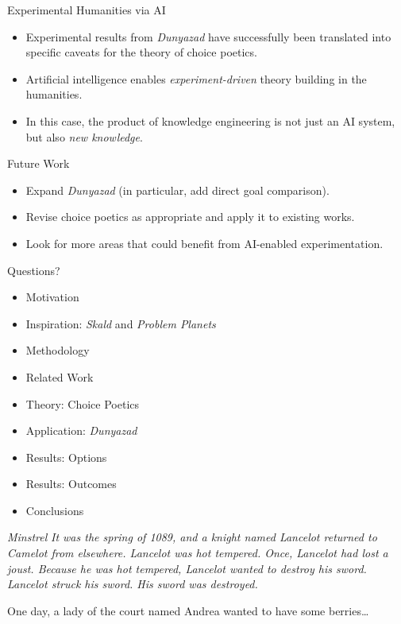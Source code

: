\documentclass[xcolor=x11names]{beamer}
\def\dunyazad/{\textit{Dunyazad}}
\def\minstrel/{\textit{Minstrel}}
\def\skald/{\textit{Skald}}
\def\problemplanets/{\textit{Problem Planets}}
\begin{document}
\begin{frame}{Experimental Humanities via AI}
  \begin{itemize}\addtolength{\itemsep}{0.5\baselineskip}
    \item Experimental results from \dunyazad/ have successfully been translated into specific caveats for the theory of choice poetics.
    \item Artificial intelligence enables \emph{experiment-driven} theory building in the humanities.
    \item In this case, the product of knowledge engineering is not just an AI system, but also \emph{new knowledge}.
  \end{itemize}
\end{frame}

\begin{frame}{Future Work}
  \begin{itemize}\addtolength{\itemsep}{0.5\baselineskip}
    \item Expand \dunyazad/ (in particular, add direct goal comparison).
    \item Revise choice poetics as appropriate and apply it to existing works.
    \item Look for more areas that could benefit from AI-enabled experimentation.
  \end{itemize}
\end{frame}

\begin{frame}{Questions?}
  \begin{itemize}
    \item Motivation
    \item Inspiration: \skald/ and \problemplanets/
    \item Methodology
    \item Related Work
    \item Theory: Choice Poetics
    \item Application: \dunyazad/
    \item Results: Options
    \item Results: Outcomes
    \item Conclusions
  \end{itemize}
\end{frame}


\begin{frame}{\minstrel/}
  \justifying
  \setlength{\parindent}{1.5em}
  \itshape
  It was the spring of 1089, and a knight named Lancelot returned to Camelot from elsewhere. Lancelot was hot tempered. Once, Lancelot had lost a joust. Because he was hot tempered, Lancelot wanted to destroy his sword. Lancelot struck his sword. His sword was destroyed.

  One day, a lady of the court named Andrea wanted to have some berries\ldots
\end{frame}
\end{document}
